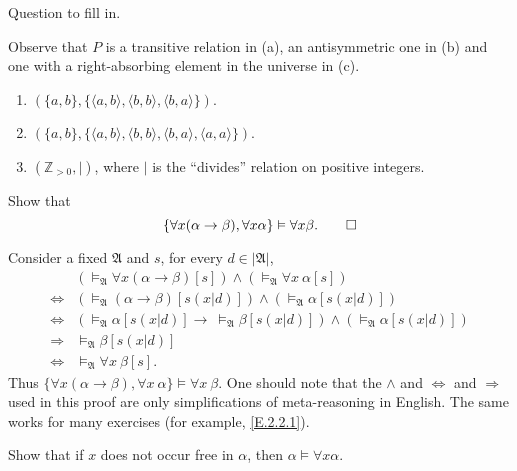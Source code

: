 \begin{exercise}
  Question to fill in.
\end{exercise}

Observe that $P$ is a transitive relation in (a), an antisymmetric one in (b) and one with a right-absorbing element in the universe in (c).
\begin{enumerate}
  \item $(\{a,b\},\{\langle a,b\rangle,\langle b,b\rangle,\langle b,a\rangle\})$.
  \item $(\{a,b\},\{\langle a,b\rangle,\langle b,b\rangle,\langle b,a\rangle,\langle a,a\rangle\})$.
  \item $(\mathbb{Z}_{>0}, |)$, where $|$ is the ``divides'' relation on positive integers.
\end{enumerate}

\begin{exercise}
  Show that
  \[
    \{\forall x(\alpha\to \beta),\forall x \alpha\}\vDash\forall x \beta.\qedhere
  \]
\end{exercise}

Consider a fixed $\mathfrak{A}$ and $s$, for every $d\in|\mathfrak{A}|$,
\begin{align*}
                  & (\vDash_{\mathfrak{A}}\forall x(\alpha\rightarrow \beta)[s])\wedge(\vDash_{\mathfrak{A}}\forall x\ \alpha[s])                    \\
  \Leftrightarrow & (\vDash_{\mathfrak{A}}(\alpha\rightarrow \beta)[s(x|d)])\wedge(\vDash_{\mathfrak{A}} \alpha[s(x|d)])                             \\
  \Leftrightarrow & (\vDash_{\mathfrak{A}}\alpha[s(x|d)]\rightarrow\ \vDash_{\mathfrak{A}}\beta[s(x|d)])\wedge(\vDash_{\mathfrak{A}} \alpha[s(x|d)]) \\
  \Rightarrow     & \vDash_{\mathfrak{A}}\beta[s(x|d)]                                                                                               \\
  \Leftrightarrow & \vDash_{\mathfrak{A}}\forall x\ \beta[s].
\end{align*}
Thus $\{\forall x(\alpha\rightarrow \beta),\forall x\ \alpha\}\vDash\forall x\ \beta$. One should note that the $\wedge$ and $\Leftrightarrow$ and $\Rightarrow$ used in this proof are only simplifications of meta-reasoning in English. The same works for many exercises (for example, \ref{E.2.2.1}).

\begin{exercise}
  Show that if $x$ does not occur free in $\alpha$, then $\alpha\vDash\forall x \alpha$.
\end{exercise}

